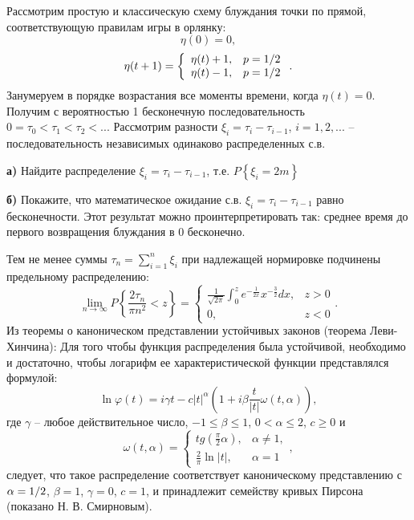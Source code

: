 \begin{problem}

Рассмотрим простую и классическую схему блуждания точки по прямой, соответствующую правилам игры в орлянку:
\[\eta (0)=0,\] 
\[\eta (t+1)=\left\{\begin{array}{cc} {\eta (t)+1,} & {p={1\mathord{\left/ {\vphantom {1 2}} \right. \kern-\nulldelimiterspace} 2} } \\ {\eta (t)-1,} & {p={1\mathord{\left/ {\vphantom {1 2}} \right. \kern-\nulldelimiterspace} 2} } \end{array}\right. .\] 
Занумеруем в порядке возрастания все моменты времени, когда $\eta (t)=0$. Получим с вероятностью 1 бесконечную последовательность $0=\tau _{0} <\tau _{1} <\tau _{2} <...$ Рассмотрим разности $\xi _{i} =\tau _{i} -\tau _{i-1} $, $i=1,2,...$ -- последовательность независимых одинаково распределенных с.в.

\textbf{а)} Найдите распределение $\xi _{i} =\tau _{i} -\tau _{i-1} $, т.е. $P\left\{\xi _{i} =2m\right\}$

\textbf{б)} Покажите, что математическое ожидание с.в. $\xi _{i} =\tau _{i} -\tau _{i-1} $ равно бесконечности. Этот результат можно проинтерпретировать так: среднее время до первого возвращения блуждания в 0 бесконечно.

Тем не менее суммы $\tau _{n} =\sum _{i=1}^{n}\xi _{i}  $ при надлежащей нормировке подчинены предельному распределению: 
\[\mathop{\lim }\limits_{n\to \infty } P\left\{\frac{2\tau _{n} }{\pi n^{2} } <z\right\}=\left\{\begin{array}{cc} {\frac{1}{\sqrt{2\pi } } \int _{0}^{z}e^{-\frac{1}{2x} } x^{-\frac{3}{2} }  dx,} & {z>0} \\ {0,} & {z<0} \end{array}\right. .\] 
Из теоремы о каноническом представлении устойчивых законов (теорема Леви-Хинчина): Для того чтобы функция распределения была устойчивой, необходимо и достаточно, чтобы логарифм ее характеристической функции представлялся формулой:
\[\ln \varphi (t)=i\gamma t-c|t|^{\alpha } \left(1+i\beta \frac{t}{|t|} \omega (t,\alpha )\right),\] 
где $\gamma $ -- любое действительное число, $-1\le \beta \le 1$, $0<\alpha \le 2$, $c\ge 0$ и
\[\omega (t,\alpha )=\left\{\begin{array}{cc} {tg\left(\frac{\pi }{2} \alpha \right),} & {\alpha \ne 1,} \\ {\frac{2}{\pi } \ln |t|,} & {\alpha =1} \end{array}\right. ,\] 
следует, что такое распределение соответствует каноническому представлению с $\alpha ={1\mathord{\left/ {\vphantom {1 2}} \right. \kern-\nulldelimiterspace} 2} $, $\beta =1$, $\gamma =0$, $c=1$, и принадлежит семейству кривых Пирсона (показано Н. В. Смирновым).

\end{problem}


